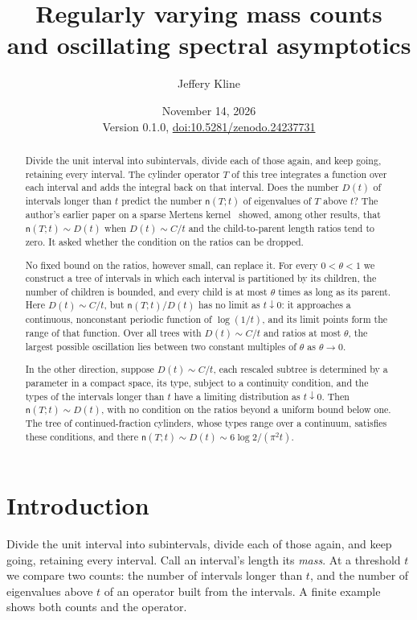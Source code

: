 \documentclass[11pt]{article}
\title{Regularly varying mass counts\\ and oscillating spectral asymptotics}
\author{Jeffery Kline}
\date{November 14, 2026\\[3pt]\small Version 0.1.0, \href{https://doi.org/10.5281/zenodo.24237731}{doi:10.5281/zenodo.24237731}}
\theoremstyle{definition}
\theoremstyle{remark}
\newcommand{\ncount}{\mathsf n}
\begin{document}
\maketitle
\begin{abstract}
Divide the unit interval into subintervals, divide each of those again,
and keep going, retaining every interval. The cylinder operator $T$ of
this tree integrates a function over each interval and adds the integral
back on that interval. Does the number $D(t)$ of intervals longer than
$t$ predict the number $\ncount(T;t)$ of eigenvalues of $T$ above $t$?
The author's earlier paper on a sparse Mertens kernel~\cite{K26} showed,
among other results, that $\ncount(T;t)\sim D(t)$ when $D(t)\sim C/t$
and the child-to-parent length ratios tend to zero. It asked whether the
condition on the ratios can be dropped.

No fixed bound on the ratios, however small, can replace it. For every
$0<\theta<1$ we construct a tree of intervals in which each interval is
partitioned by its children, the number of children is bounded, and
every child is at most $\theta$ times as long as its parent. Here
$D(t)\sim C/t$, but $\ncount(T;t)/D(t)$ has no limit as $t\downarrow0$:
it approaches a continuous, nonconstant periodic function of
$\log(1/t)$, and its limit points form the range of that function.
Over all trees with $D(t)\sim C/t$ and ratios at most $\theta$, the
largest possible oscillation lies between two constant multiples of
$\theta$ as $\theta\to0$.

In the other direction, suppose $D(t)\sim C/t$, each rescaled subtree is
determined by a parameter in a compact space, its type, subject to a
continuity condition, and the types of the intervals longer than $t$
have a limiting distribution as $t\downarrow0$. Then
$\ncount(T;t)\sim D(t)$, with no condition on the ratios beyond a uniform
bound below one. The tree of continued-fraction cylinders, whose types range over a
continuum, satisfies these conditions, and there
$\ncount(T;t)\sim D(t)\sim 6\log2/(\pi^2t)$.
\end{abstract}

\section{Introduction}\label{sec:intro}

Divide the unit interval into subintervals, divide each of those again,
and keep going, retaining every interval. Call an interval's length its
\emph{mass}. At a threshold $t$ we compare two counts: the number of
intervals longer than $t$, and the number of eigenvalues above $t$ of an
operator built from the intervals. A finite example shows both counts
and the operator.
\end{document}
